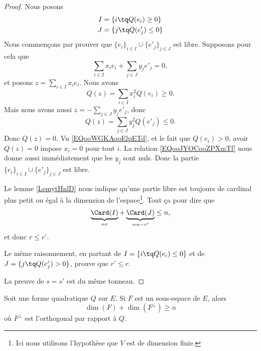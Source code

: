 \begin{proof}
	Nous posons
	\begin{subequations}
		\begin{align}
			I & =\{ i\tq Q(e_i)\geq 0 \}  \\
			J & =\{ j\tq Q(e_j')\leq 0 \}
		\end{align}
	\end{subequations}
	Nous commençons par prouver que \( \{ e_i \}_{i\in I}\cup\{ e'_j \}_{j\in J}\) est libre. Supposons pour cela que
	\begin{equation}
		\sum_{i\in I}x_ie_i+\sum_{j\in J}y_je'_j=0,
	\end{equation}
	et posons \( z=\sum_{i\in I}x_ie_i\). Nous avons
	\begin{equation}        \label{EQooWGKAooElpETd}
		Q(z)=\sum_{i\in I}x_i^2Q(e_i)\geq 0.
	\end{equation}
	Mais nous avons aussi \( z=-\sum_{j\in J}y_je'_j\), donc
	\begin{equation}        \label{EQooJYOCooZPXmTf}
		Q(z)=\sum_{j\in J}y_j^2Q(e'_j)\leq 0.
	\end{equation}
	Donc \( Q(z)=0\). Vu \eqref{EQooWGKAooElpETd}, et le fait que \( Q(e_i)>0\), avoir \( Q(z)=0\) impose \( x_i=0\) pour tout \( i\). La relation \eqref{EQooJYOCooZPXmTf} nous donne aussi immédiatement que les \( y_j\) sont nuls. Donc la partie \( \{ e_i \}_{i\in I}\cup\{ e'_j \}_{j\in J}\) est libre.

	Le lemme \ref{LemytHnlD} nous indique qu'une partie libre est toujours de cardinal plus petit ou égal à la dimension de l'espace\footnote{Ici nous utilisons l'hypothèse que \( V\) est de dimension finie.}. Tout ça pour dire que
	\begin{equation}
		\underbrace{\Card(I)}_{=r}+\underbrace{\Card(J)}_{=n-r'}\leq n,
	\end{equation}
	et donc \( r\leq r'\).

	Le même raisonnement, en partant de \( I=\{ i\tq Q(e_i)\leq 0 \}\) et de \( J=\{ j\tq Q(e'_j)>0 \}\), prouve que \( r'\leq r\).

	La preuve de \( s=s'\) est du même tonneau.
\end{proof}

\begin{lemma}     \label{LEMooOQIDooPSOeXL}
	Soit une forme quadratique \( Q\) sur \( E\). Si \( F\) est un sous-espace de \( E\), alors
	\begin{equation}
		\dim(F)+\dim(F^{\perp})\geq n
	\end{equation}
	où \( F^{\perp}\) est l'orthogonal par rapport à \( Q\).
\end{lemma}

